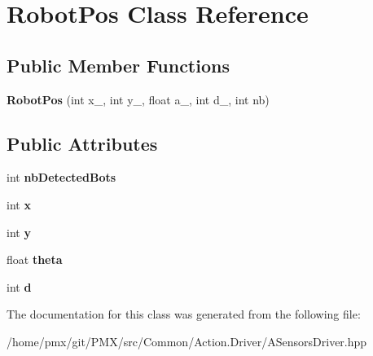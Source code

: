 \hypertarget{classRobotPos}{}\section{Robot\+Pos Class Reference}
\label{classRobotPos}
\subsection*{Public Member Functions}
\begin{DoxyCompactItemize}
\item 
\mbox{\label{classRobotPos_a5d243b49b90ba5601f6fe7f1b155846e}} 
{\bfseries Robot\+Pos} (int x\+\_\+, int y\+\_\+, float a\+\_\+, int d\+\_\+, int nb)
\end{DoxyCompactItemize}
\subsection*{Public Attributes}
\begin{DoxyCompactItemize}
\item 
\mbox{\label{classRobotPos_a7e40220f593f34fff8eb7dff8ae5fe70}} 
int {\bfseries nb\+Detected\+Bots}
\item 
\mbox{\label{classRobotPos_a2523c1801d3d8224fe12b14da887ba37}} 
int {\bfseries x}
\item 
\mbox{\label{classRobotPos_adfc0fd6cf7f2cba2c7932224d4f66c70}} 
int {\bfseries y}
\item 
\mbox{\label{classRobotPos_aba7659a2a9a11518ad5dddf8727d95d8}} 
float {\bfseries theta}
\item 
\mbox{\label{classRobotPos_a74c625cfb9fcb5fcb98742d10a7d81c2}} 
int {\bfseries d}
\end{DoxyCompactItemize}


The documentation for this class was generated from the following file\+:\begin{DoxyCompactItemize}
\item 
/home/pmx/git/\+P\+M\+X/src/\+Common/\+Action.\+Driver/A\+Sensors\+Driver.\+hpp\end{DoxyCompactItemize}
